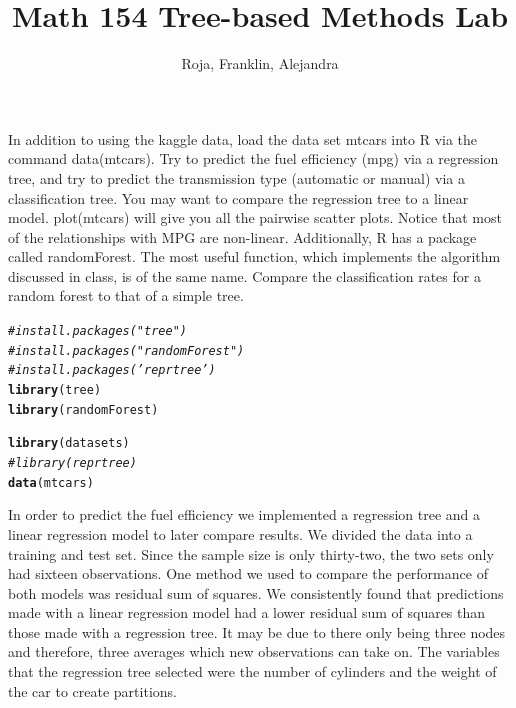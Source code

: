 \documentclass{article}\usepackage[]{graphicx}\usepackage[]{color}
\makeatletter
\newcommand{\hlcom}[1]{\textcolor[rgb]{0.678,0.584,0.686}{\textit{#1}}}%
\newcommand{\hlstd}[1]{\textcolor[rgb]{0.345,0.345,0.345}{#1}}%
\newcommand{\hlkwd}[1]{\textcolor[rgb]{0.737,0.353,0.396}{\textbf{#1}}}%
\newenvironment{kframe}{%
 \def\at@end@of@kframe{}%
 \ifinner\ifhmode%
  \def\at@end@of@kframe{\end{minipage}}%
  \begin{minipage}{\columnwidth}%
 \fi\fi%
 \def\FrameCommand##1{\hskip\@totalleftmargin \hskip-\fboxsep
 \colorbox{shadecolor}{##1}\hskip-\fboxsep
     \hskip-\linewidth \hskip-\@totalleftmargin \hskip\columnwidth}%
 \MakeFramed {\advance\hsize-\width
   \@totalleftmargin\z@ \linewidth\hsize
   \@setminipage}}%
 {\par\unskip\endMakeFramed%
 \at@end@of@kframe}
\newenvironment{knitrout}{}{} %
\makeatother
\begin{document}
\title{Math 154 Tree-based Methods Lab}
\author{Roja, Franklin, Alejandra}
\maketitle

In addition to using the kaggle data, load the data set mtcars into R via the
command data(mtcars). Try to predict the fuel efficiency (mpg) via a regression tree, and try to predict the transmission type (automatic or manual) via a classification tree. You may want to compare the regression tree to a linear model. plot(mtcars) will give you all the pairwise scatter plots. Notice that most of the relationships with MPG are non-linear. Additionally, R has a package called randomForest. The most useful function, which implements the algorithm discussed in class, is of the same name. Compare the classification rates for a random forest to that of a simple tree.

\begin{knitrout}
\color{fgcolor}\begin{kframe}
\begin{alltt}
\hlcom{# install.packages("tree")}
\hlcom{# install.packages("randomForest")}
\hlcom{# install.packages('reprtree')}
\hlkwd{library}\hlstd{(tree)}
\hlkwd{library}\hlstd{(randomForest)}
\end{alltt}


{\ttfamily\noindent\itshape\color{messagecolor}{\#\# randomForest 4.6-12}}

{\ttfamily\noindent\itshape\color{messagecolor}{\#\# Type rfNews() to see new features/changes/bug fixes.}}\begin{alltt}
\hlkwd{library}\hlstd{(datasets)}
\hlcom{# library(reprtree)}
\hlkwd{data}\hlstd{(mtcars)}
\end{alltt}
\end{kframe}
\end{knitrout}


In order to predict the fuel efficiency we implemented a regression tree and  a linear regression model to later compare results. We divided the data into a training and test set. Since the sample size is only thirty-two, the two sets only had sixteen observations. One method we used to compare the performance of both models was residual sum of squares. We consistently found that predictions made with a linear regression model had a lower residual sum of squares than those made with a regression tree. It may be due to there only being three nodes and therefore, three averages which new observations can take on. The variables that the regression tree selected were the number of cylinders and the weight of the car to create partitions. 
\end{document}
